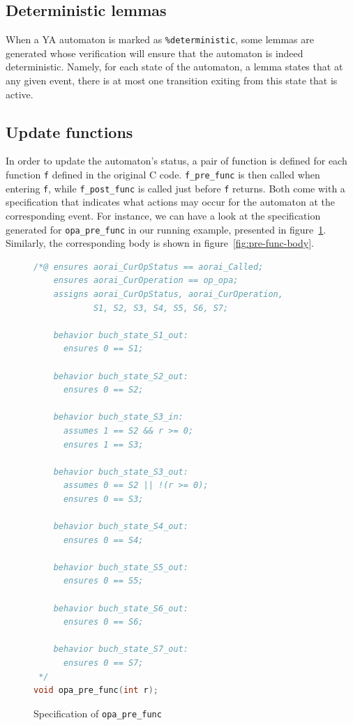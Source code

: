 \documentclass{report}
\begin{document}
\subsection{Deterministic lemmas}
\lstset{language=ya}
When a YA automaton is marked as \lstinline|%deterministic|, some lemmas are 
generated whose verification will ensure that the automaton is indeed 
deterministic. Namely, for each state of the automaton, a lemma states that
at any given event, there is at most one transition exiting from this state
that is active.

\subsection{Update functions}

In order to update the automaton's status, a pair of function is defined for
each function \texttt{f} defined in the original C code. \texttt{f\_pre\_func}
is then called when entering \texttt{f}, while \texttt{f\_post\_func} is called
just before \texttt{f} returns. Both come with a specification that indicates
what actions may occur for the automaton at the corresponding event.
For instance, we can have a look at the specification generated for
\texttt{opa\_pre\_func} in our running example, presented in 
figure~\ref{fig:pre-func}. Similarly, the corresponding body is shown in figure~\ref{fig:pre-func-body}.
\begin{figure}[htbp]
\begin{lstlisting}[language=C,alsolanguage=ACSL]
/*@ ensures aorai_CurOpStatus == aorai_Called;
    ensures aorai_CurOperation == op_opa;
    assigns aorai_CurOpStatus, aorai_CurOperation,
            S1, S2, S3, S4, S5, S6, S7;
    
    behavior buch_state_S1_out:
      ensures 0 == S1;
    
    behavior buch_state_S2_out:
      ensures 0 == S2;
    
    behavior buch_state_S3_in:
      assumes 1 == S2 && r >= 0;
      ensures 1 == S3;
    
    behavior buch_state_S3_out:
      assumes 0 == S2 || !(r >= 0);
      ensures 0 == S3;
    
    behavior buch_state_S4_out:
      ensures 0 == S4;
    
    behavior buch_state_S5_out:
      ensures 0 == S5;
    
    behavior buch_state_S6_out:
      ensures 0 == S6;
    
    behavior buch_state_S7_out:
      ensures 0 == S7;
 */
void opa_pre_func(int r);
\end{lstlisting}
\caption{Specification of \texttt{opa\_pre\_func}}\label{fig:pre-func}
\end{figure}
\end{document}
